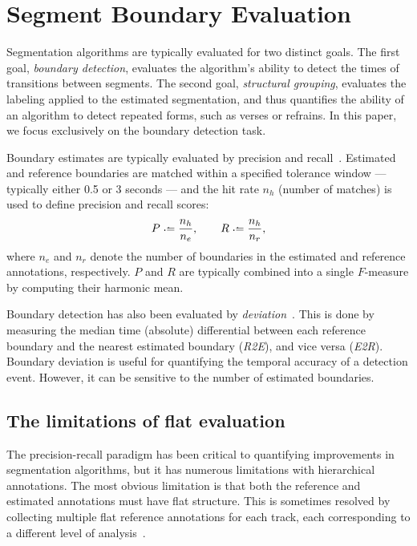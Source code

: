 \documentclass{article}
\begin{document}
\section{Segment Boundary Evaluation}\label{sec:curr_meth}

Segmentation algorithms are typically evaluated for two distinct goals.  
The first goal, \emph{boundary detection}, evaluates the algorithm's ability to detect the times of transitions between segments.
The second goal, \emph{structural grouping}, evaluates the labeling applied to the estimated segmentation, and thus quantifies the ability of an algorithm to detect repeated forms, such as verses or refrains. 
In this paper, we focus exclusively on the boundary detection task.

Boundary estimates are typically evaluated by precision and recall~\cite{turnbull2007supervised}.
Estimated and reference boundaries are matched within a specified tolerance window --- typically either 0.5 or 3 seconds --- and the hit rate $n_h$ (number of matches) is used to define precision and recall scores:
\begin{equation}
P \defeq \frac{n_h}{n_e}, \quad\quad R \defeq \frac{n_h}{n_r},
\end{equation}
where $n_e$ and $n_r$ denote the number of boundaries in the estimated and reference
annotations, respectively.
$P$ and $R$ are typically combined into a single $F$-measure by computing their harmonic mean.

Boundary detection has also been evaluated by \emph{deviation}~\cite{turnbull2007supervised}.
This is done by measuring the median time (absolute) differential between each reference boundary and the nearest estimated boundary (\emph{R2E}), and vice versa (\emph{E2R}).
Boundary deviation is useful for quantifying the temporal accuracy of a detection event.
However, it can be sensitive to the number of estimated boundaries.

\subsection{The limitations of flat evaluation}
The precision-recall paradigm has been critical to quantifying improvements in segmentation algorithms, but it has numerous limitations with hierarchical annotations.
The most obvious limitation is that both the reference and estimated annotations must have flat structure.
This is sometimes resolved by collecting multiple flat reference annotations for each track, 
each corresponding to a different level of analysis~\cite{Smith2011}.
\end{document}
